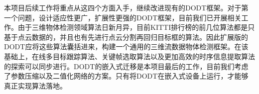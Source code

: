 本项目后续工作将重点从这四个方面入手，继续改进现有的DODT框架。对于第一个问题，设计适应性更广，扩展性更强的DODT框架，目前我们已开展相关工作。由于三维物体检测领域算法日新月异，目前KITTI排行榜的前几位算法都是只基于点云数据的，并且也有先进行点云分割再回归目标框的算法。因此扩展版的DODT应将这些算法囊括进来，构建一个通用的三维流数据物体检测框架。在该基础上，在线多目标跟踪算法、关键帧选取算法以及更加高效的时序信息提取算法的探索可以同步进行。DODT的嵌入式迁移是本项目最后的工作，目前我们考虑了参数压缩以及二值化网络的方案。只有将DODT在嵌入式设备上运行，才能够真正实现算法落地。

\ifprint
	\newpage
	\thispagestyle{empty}
	\mbox{}
	
	\clearpage
	\setcounter{page}{10}
\fi